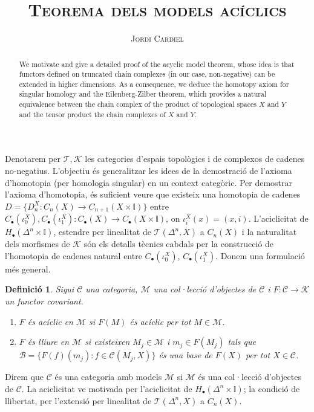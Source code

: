 \documentclass[compress]{article}
\title{\large{\textsc{\textbf{Teorema dels models acíclics}}}}
\author{\textsc{Jordi Cardiel}}
\date{}
\newtheorem{definicio}{Definició}
\theoremstyle{definition}
\begin{document}
\maketitle
\begin{abstract}
    We motivate and give a detailed proof of the acyclic model theorem, whose idea is that functors defined on truncated chain complexes (in our case, non-negative) can be extended in higher dimensions. As a consequence, we deduce the homotopy axiom for singular homology and the Eilenberg-Zilber theorem, which provides a natural equivalence between the chain complex of the product of topological spaces $X$ and $Y$ and the tensor product the chain complexes of $X$ and $Y$.
\end{abstract}
Denotarem per $\mathscr{T},\mathscr{K}$ les categories d'espais topològics i de complexos de cadenes no-negatius. L'objectiu és generalitzar les idees de la demostració de l'axioma d'homotopia (per homologia singular) en un context categòric.\newline
Per demostrar l'axioma d'homotopia, és suficient veure que existeix una homotopia de cadenes $D=\{D_{n}^{X}:C_{n}(X)\rightarrow C_{n+1}(X\times\mathbb{I})\}$ entre $C_{\bullet}(\iota_{0}^{X}),C_{\bullet}(\iota_{1}^{X}):C_{\bullet}(X)\rightarrow C_{\bullet}(X\times\mathbb{I})$, on $\iota_{i}^{X}(x)=(x,i)$. L'aciclicitat de $H_{\bullet}(\Delta^{n}\times\mathbb{I})$, estendre per linealitat de $\mathscr{T}(\Delta^{n},X)$ a $C_{n}(X)$ i la naturalitat dels morfismes de $\mathscr{K}$ són els detalls tècnics cabdals per la construcció de l'homotopia de cadenes natural entre $C_{\bullet}(\iota_{0}^{X})$, $C_{\bullet}(\iota_{1}^{X})$. Donem una formulació més general.
\begin{definicio}
    Sigui $\mathscr{C}$ una categoria, $\mathscr{M}$ una col·lecció  d'objectes de $\mathscr{C}$ i $F:\mathscr{C}\rightarrow\mathscr{K}$ un functor covariant.
    \begin{enumerate}
        \item $F$ és acíclic en $\mathscr{M}$ si $F(M)$ és acíclic per tot $M\in\mathscr{M}$.
        \item $F$ és lliure en $\mathscr{M}$ si existeixen $M_{j}\in\mathscr{M}$ i $m_{j}\in F(M_{j})$ tals que $\mathscr{B}=\{F(f)(m_{j}):f\in\mathscr{C}(M_{j},X)\}$ és una base de $F(X)$ per tot $X\in\mathscr{C}$.
    \end{enumerate}
\end{definicio}
Direm que $\mathscr{C}$ és una categoria amb models $\mathscr{M}$ si $\mathscr{M}$ és una col·lecció d'objectes de $\mathscr{C}$. La aciclicitat ve motivada per l'aciclicitat de $H_{\bullet}(\Delta^{n}\times\mathbb{I})$; la condició de llibertat, per l'extensió per linealitat de $\mathscr{T}(\Delta^{n},X)$ a $C_{n}(X)$.
\end{document}
